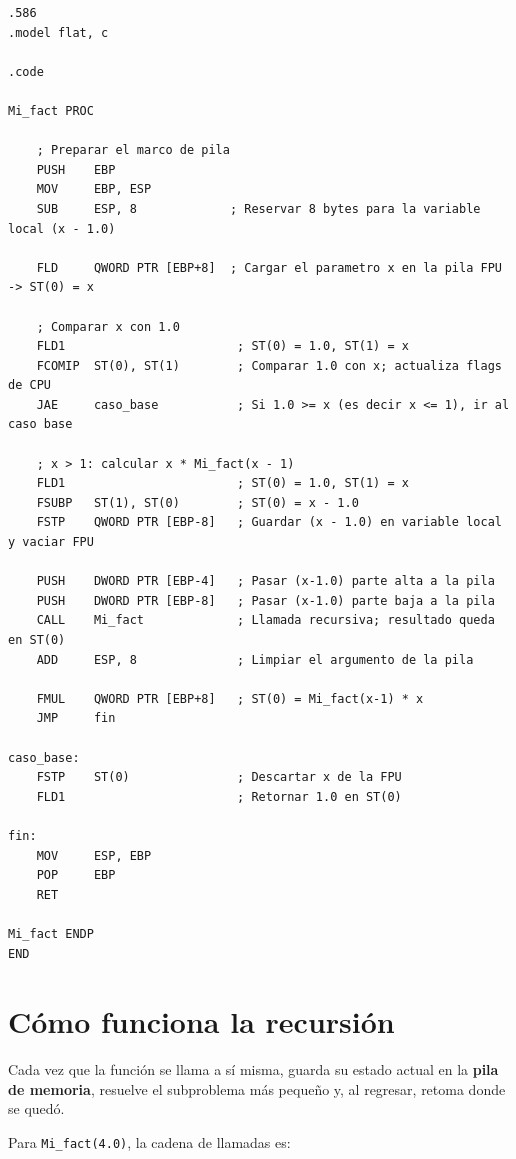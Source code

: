 \documentclass[12pt, letterpaper]{article}
\begin{document}
\begin{lstlisting}[language=MASM, caption={factorial.asm --- Implementación recursiva con FPU}]
.586
.model flat, c

.code

Mi_fact PROC

    ; Preparar el marco de pila
    PUSH    EBP
    MOV     EBP, ESP
    SUB     ESP, 8             ; Reservar 8 bytes para la variable local (x - 1.0)

    FLD     QWORD PTR [EBP+8]  ; Cargar el parametro x en la pila FPU -> ST(0) = x

    ; Comparar x con 1.0
    FLD1                        ; ST(0) = 1.0, ST(1) = x
    FCOMIP  ST(0), ST(1)        ; Comparar 1.0 con x; actualiza flags de CPU
    JAE     caso_base           ; Si 1.0 >= x (es decir x <= 1), ir al caso base

    ; x > 1: calcular x * Mi_fact(x - 1)
    FLD1                        ; ST(0) = 1.0, ST(1) = x
    FSUBP   ST(1), ST(0)        ; ST(0) = x - 1.0
    FSTP    QWORD PTR [EBP-8]   ; Guardar (x - 1.0) en variable local y vaciar FPU

    PUSH    DWORD PTR [EBP-4]   ; Pasar (x-1.0) parte alta a la pila
    PUSH    DWORD PTR [EBP-8]   ; Pasar (x-1.0) parte baja a la pila
    CALL    Mi_fact             ; Llamada recursiva; resultado queda en ST(0)
    ADD     ESP, 8              ; Limpiar el argumento de la pila

    FMUL    QWORD PTR [EBP+8]   ; ST(0) = Mi_fact(x-1) * x
    JMP     fin

caso_base:
    FSTP    ST(0)               ; Descartar x de la FPU
    FLD1                        ; Retornar 1.0 en ST(0)

fin:
    MOV     ESP, EBP
    POP     EBP
    RET

Mi_fact ENDP
END
\end{lstlisting}

\section{Cómo funciona la recursión}

Cada vez que la función se llama a sí misma, guarda su estado actual en la \textbf{pila de memoria}, resuelve el subproblema más pequeño y, al regresar, retoma donde se quedó.

Para \texttt{Mi\_fact(4.0)}, la cadena de llamadas es:
\end{document}
